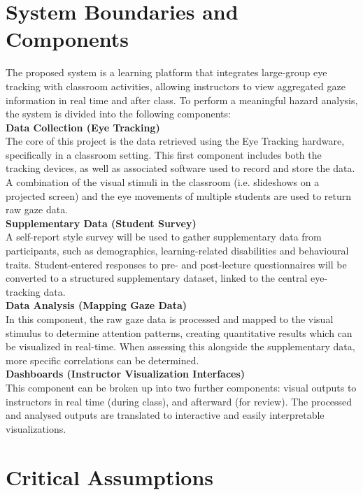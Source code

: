 \documentclass{article}
\begin{document}
\section{System Boundaries and Components}

The proposed system is a learning platform that integrates large-group eye tracking with classroom activities, allowing instructors to view aggregated gaze information in real time and after class. To perform a meaningful hazard analysis, the system is divided into the following components:\\
\textbf{Data Collection (Eye Tracking)}\\
The core of this project is the data retrieved using the Eye Tracking hardware, specifically in a classroom setting. This first component includes both the tracking devices, as well as associated software used to record and store the data. A combination of the visual stimuli in the classroom (i.e. slideshows on a projected screen) and the eye movements of multiple students are used to return raw gaze data.\\
\textbf{Supplementary Data (Student Survey)}\\
A self-report style survey will be used to gather supplementary data from participants, such as demographics, learning-related disabilities and behavioural traits. Student-entered responses to pre- and post-lecture questionnaires will be converted to a structured supplementary dataset, linked to the central eye-tracking data.\\
\textbf{Data Analysis (Mapping Gaze Data)}\\
In this component, the raw gaze data is processed and mapped to the visual stimulus to determine attention patterns, creating quantitative results which can be visualized in real-time. When assessing this alongside the supplementary data, more specific correlations can be determined.\\
\textbf{Dashboards (Instructor Visualization Interfaces)}\\
This component can be broken up into two further components: visual outputs to instructors in real time (during class), and afterward (for review). The processed and analysed outputs are translated to interactive and easily interpretable visualizations.


\section{Critical Assumptions}
\end{document}
